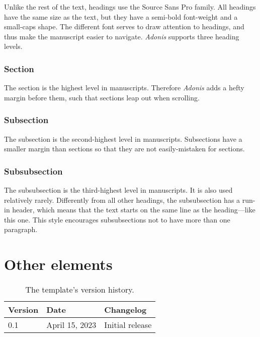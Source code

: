 \documentclass{adonis}
\begin{document}
			Unlike the rest of the text, headings use the Source Sans Pro family.
			All headings have the same size as the text, but they have a semi-bold font-weight and a small-caps shape.
			The different font serves to draw attention to headings, and thus make the manuscript easier to navigate.
			\textit{Adonis} supports three heading levels.
		
			\subsubsection{Section}
			
				The section is the highest level in manuscripts.
				Therefore \textit{Adonis} adds a hefty margin before them, such that sections leap out when scrolling.
			
			\subsubsection{Subsection}
			
				The subsection is the second-highest level in manuscripts.
				Subsections have a smaller margin than sections so that they are not easily-mistaken for sections.
			
			\subsubsection{Subsubsection}
			
				The subsubsection is the third-highest level in manuscripts.
				It is also used relatively rarely.
				Differently from all other headings, the subsubsection has a run-in header, which means that the text starts on the same line as the heading—like this one.
				This style encourages subsubsections not to have more than one paragraph.
			
	\section{Other elements}
	
		\begin{table*}[t!]
			\begin{tabularx}{\linewidth}{ l l X }
				\textbf{Version} & \textbf{Date} & \textbf{Changelog} \\ \hline
				0.1 & April 15, 2023 & Initial release \\
			\end{tabularx}
			\caption{The template's version history.}
			\label{"Table: version history"}
		\end{table*}
	
\end{document}
